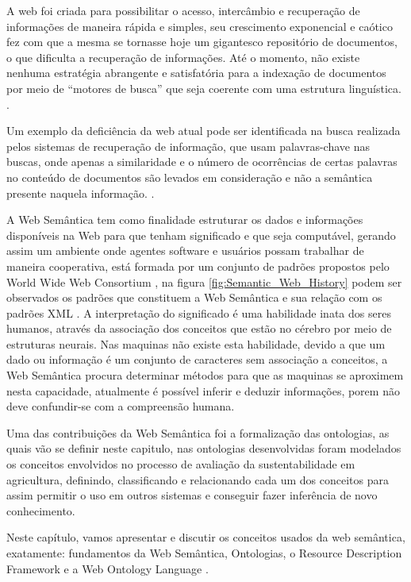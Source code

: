 A web foi criada para possibilitar o acesso, intercâmbio e recuperação
de informações de maneira rápida e simples, seu crescimento exponencial
e caótico fez com que a mesma se tornasse hoje um gigantesco repositório
de documentos, o que dificulta a recuperação de informações. Até o
momento, não existe nenhuma estratégia abrangente e satisfatória para
a indexação de documentos por meio de “motores de busca” que seja
coerente com uma estrutura linguística. \citet{Souza:2004}.

Um exemplo da deficiência da web atual pode ser identificada na busca
realizada pelos sistemas de recuperação de informação, que usam palavras-chave
nas buscas, onde apenas a similaridade e o número de ocorrências de
certas palavras no conteúdo de documentos são levados em consideração
e não a semântica presente naquela informação. \citep{Souza:2004}.

A Web Semântica tem como finalidade estruturar os dados e informações
disponíveis na Web para que tenham significado e que seja computável,
gerando assim um ambiente onde agentes software e usuários possam
trabalhar de maneira cooperativa, está formada por um conjunto de
padrões propostos pelo World Wide Web Consortium ,
na figura \ref{fig:Semantic_Web_History} podem ser observados os
padrões que constituem a Web Semântica e sua relação com os padrões
XML . A interpretação
do significado é uma habilidade inata dos seres humanos, através da
associação dos conceitos que estão no cérebro por meio de estruturas
neurais. Nas maquinas não existe esta habilidade, devido a que um
dado ou informação é um conjunto de caracteres sem associação a conceitos,
a Web Semântica procura determinar métodos para que as maquinas se
aproximem nesta capacidade, atualmente é possível inferir e deduzir
informações, porem não deve confundir-se com a compreensão humana.

Uma das contribuições da Web Semântica foi a formalização das ontologias,
as quais vão se definir neste capitulo, nas ontologias desenvolvidas
foram modelados os conceitos envolvidos no processo de avaliação da
sustentabilidade em agricultura, definindo, classificando e relacionando
cada um dos conceitos para assim permitir o uso em outros sistemas
e conseguir fazer inferência de novo conhecimento.

Neste capítulo, vamos apresentar e discutir os conceitos usados da
web semântica, exatamente: fundamentos da Web Semântica, Ontologias,
o \foreignlanguage{english}{Resource Description Framework} 
e a \foreignlanguage{english}{Web Ontology Language} .

